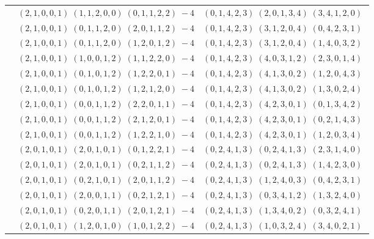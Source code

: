 \documentclass[11pt]{article}
\begin{document}
\begin{longtable}[l]{|c|c|c|}
 \cline{2-3} 
 & $(2 ,1 ,0 ,0 ,1) \;(1 ,1 ,2 ,0 ,0) \;(0 ,1 ,1 ,2 ,2) \;-4$ & $(0 ,1 ,4 ,2 ,3) \;(2 ,0 ,1 ,3 ,4) \;(3 ,4 ,1 ,2 ,0) \;$\\ 
 \cline{2-3} 
 & $(2 ,1 ,0 ,0 ,1) \;(0 ,1 ,1 ,2 ,0) \;(2 ,0 ,1 ,1 ,2) \;-4$ & $(0 ,1 ,4 ,2 ,3) \;(3 ,1 ,2 ,0 ,4) \;(0 ,4 ,2 ,3 ,1) \;$\\ 
 \cline{2-3} 
 & $(2 ,1 ,0 ,0 ,1) \;(0 ,1 ,1 ,2 ,0) \;(1 ,2 ,0 ,1 ,2) \;-4$ & $(0 ,1 ,4 ,2 ,3) \;(3 ,1 ,2 ,0 ,4) \;(1 ,4 ,0 ,3 ,2) \;$\\ 
 \cline{2-3} 
 & $(2 ,1 ,0 ,0 ,1) \;(1 ,0 ,0 ,1 ,2) \;(1 ,1 ,2 ,2 ,0) \;-4$ & $(0 ,1 ,4 ,2 ,3) \;(4 ,0 ,3 ,1 ,2) \;(2 ,3 ,0 ,1 ,4) \;$\\ 
 \cline{2-3} 
 & $(2 ,1 ,0 ,0 ,1) \;(0 ,1 ,0 ,1 ,2) \;(1 ,2 ,2 ,0 ,1) \;-4$ & $(0 ,1 ,4 ,2 ,3) \;(4 ,1 ,3 ,0 ,2) \;(1 ,2 ,0 ,4 ,3) \;$\\ 
 \cline{2-3} 
 & $(2 ,1 ,0 ,0 ,1) \;(0 ,1 ,0 ,1 ,2) \;(1 ,2 ,1 ,2 ,0) \;-4$ & $(0 ,1 ,4 ,2 ,3) \;(4 ,1 ,3 ,0 ,2) \;(1 ,3 ,0 ,2 ,4) \;$\\ 
 \cline{2-3} 
 & $(2 ,1 ,0 ,0 ,1) \;(0 ,0 ,1 ,1 ,2) \;(2 ,2 ,0 ,1 ,1) \;-4$ & $(0 ,1 ,4 ,2 ,3) \;(4 ,2 ,3 ,0 ,1) \;(0 ,1 ,3 ,4 ,2) \;$\\ 
 \cline{2-3} 
 & $(2 ,1 ,0 ,0 ,1) \;(0 ,0 ,1 ,1 ,2) \;(2 ,1 ,2 ,0 ,1) \;-4$ & $(0 ,1 ,4 ,2 ,3) \;(4 ,2 ,3 ,0 ,1) \;(0 ,2 ,1 ,4 ,3) \;$\\ 
 \cline{2-3} 
 & $(2 ,1 ,0 ,0 ,1) \;(0 ,0 ,1 ,1 ,2) \;(1 ,2 ,2 ,1 ,0) \;-4$ & $(0 ,1 ,4 ,2 ,3) \;(4 ,2 ,3 ,0 ,1) \;(1 ,2 ,0 ,3 ,4) \;$\\ 
 \cline{2-3} 
 & $(2 ,0 ,1 ,0 ,1) \;(2 ,0 ,1 ,0 ,1) \;(0 ,1 ,2 ,2 ,1) \;-4$ & $(0 ,2 ,4 ,1 ,3) \;(0 ,2 ,4 ,1 ,3) \;(2 ,3 ,1 ,4 ,0) \;$\\ 
 \cline{2-3} 
 & $(2 ,0 ,1 ,0 ,1) \;(2 ,0 ,1 ,0 ,1) \;(0 ,2 ,1 ,1 ,2) \;-4$ & $(0 ,2 ,4 ,1 ,3) \;(0 ,2 ,4 ,1 ,3) \;(1 ,4 ,2 ,3 ,0) \;$\\ 
 \cline{2-3} 
 & $(2 ,0 ,1 ,0 ,1) \;(0 ,2 ,1 ,0 ,1) \;(2 ,0 ,1 ,1 ,2) \;-4$ & $(0 ,2 ,4 ,1 ,3) \;(1 ,2 ,4 ,0 ,3) \;(0 ,4 ,2 ,3 ,1) \;$\\ 
 \cline{2-3} 
 & $(2 ,0 ,1 ,0 ,1) \;(2 ,0 ,0 ,1 ,1) \;(0 ,2 ,1 ,2 ,1) \;-4$ & $(0 ,2 ,4 ,1 ,3) \;(0 ,3 ,4 ,1 ,2) \;(1 ,3 ,2 ,4 ,0) \;$\\ 
 \cline{2-3} 
 & $(2 ,0 ,1 ,0 ,1) \;(0 ,2 ,0 ,1 ,1) \;(2 ,0 ,1 ,2 ,1) \;-4$ & $(0 ,2 ,4 ,1 ,3) \;(1 ,3 ,4 ,0 ,2) \;(0 ,3 ,2 ,4 ,1) \;$\\ 
 \cline{2-3} 
 & $(2 ,0 ,1 ,0 ,1) \;(1 ,2 ,0 ,1 ,0) \;(1 ,0 ,1 ,2 ,2) \;-4$ & $(0 ,2 ,4 ,1 ,3) \;(1 ,0 ,3 ,2 ,4) \;(3 ,4 ,0 ,2 ,1) \;$\\ 

\end{longtable}
\end{document}
